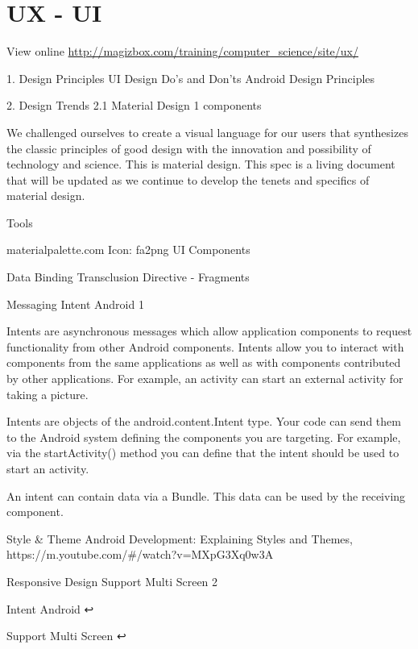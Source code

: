 \chapter{UX - UI}

View online \href{http://magizbox.com/training/computer_science/site/ux/}{http://magizbox.com/training/computer_science/site/ux/}

1. Design Principles
UI Design Do’s and Don’ts Android Design Principles

2. Design Trends
2.1 Material Design 1
components

We challenged ourselves to create a visual language for our users that synthesizes the classic principles of good design with the innovation and possibility of technology and science. This is material design. This spec is a living document that will be updated as we continue to develop the tenets and specifics of material design.



Tools

materialpalette.com
Icon: fa2png
UI Components


Data Binding
Transclusion
Directive - Fragments

Messaging
Intent Android 1

Intents are asynchronous messages which allow application components to request functionality from other Android components. Intents allow you to interact with components from the same applications as well as with components contributed by other applications. For example, an activity can start an external activity for taking a picture.

Intents are objects of the android.content.Intent type. Your code can send them to the Android system defining the components you are targeting. For example, via the startActivity() method you can define that the intent should be used to start an activity.

An intent can contain data via a Bundle. This data can be used by the receiving component.

Style & Theme
Android Development: Explaining Styles and Themes, https://m.youtube.com/#/watch?v=MXpG3Xq0w3A

Responsive Design
Support Multi Screen 2

Intent Android ↩

Support Multi Screen ↩


